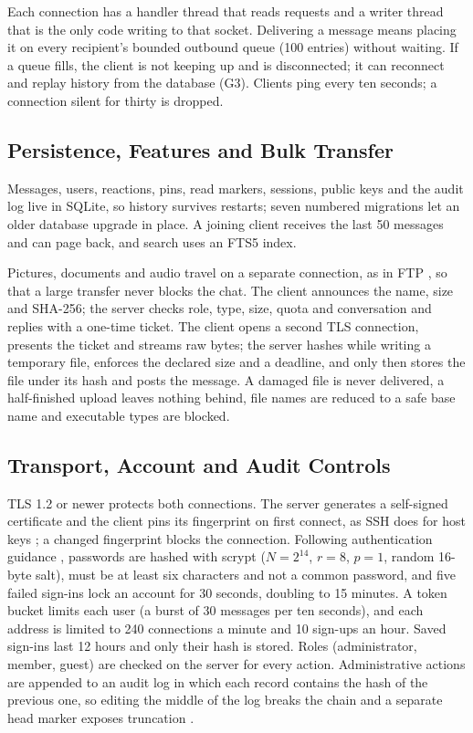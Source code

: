\documentclass[graybox]{svmult}
\begin{document}
Each connection has a handler thread that reads requests and a writer thread that is the only code writing to that socket. Delivering a message means placing it on every recipient's bounded outbound queue (100 entries) without waiting. If a queue fills, the client is not keeping up and is disconnected; it can reconnect and replay history from the database (G3). Clients ping every ten seconds; a connection silent for thirty is dropped.

\subsection{Persistence, Features and Bulk Transfer}
Messages, users, reactions, pins, read markers, sessions, public keys and the audit log live in SQLite, so history survives restarts; seven numbered migrations let an older database upgrade in place. A joining client receives the last 50 messages and can page back, and search uses an FTS5 index.

Pictures, documents and audio travel on a separate connection, as in FTP \cite{rfc959}, so that a large transfer never blocks the chat. The client announces the name, size and SHA-256; the server checks role, type, size, quota and conversation and replies with a one-time ticket. The client opens a second TLS connection, presents the ticket and streams raw bytes; the server hashes while writing a temporary file, enforces the declared size and a deadline, and only then stores the file under its hash and posts the message. A damaged file is never delivered, a half-finished upload leaves nothing behind, file names are reduced to a safe base name and executable types are blocked.

\subsection{Transport, Account and Audit Controls}
TLS 1.2 or newer protects both connections. The server generates a self-signed certificate and the client pins its fingerprint on first connect, as SSH does for host keys \cite{rfc4251}; a changed fingerprint blocks the connection. Following authentication guidance \cite{nist63b}, passwords are hashed with scrypt ($N=2^{14}$, $r=8$, $p=1$, random 16-byte salt), must be at least six characters and not a common password, and five failed sign-ins lock an account for 30 seconds, doubling to 15 minutes. A token bucket limits each user (a burst of 30 messages per ten seconds), and each address is limited to 240 connections a minute and 10 sign-ups an hour. Saved sign-ins last 12 hours and only their hash is stored. Roles (administrator, member, guest) are checked on the server for every action. Administrative actions are appended to an audit log in which each record contains the hash of the previous one, so editing the middle of the log breaks the chain and a separate head marker exposes truncation \cite{schneier99,crosby09}.
\end{document}
